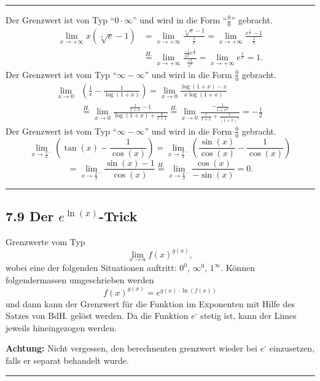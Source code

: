 \documentclass[a4paper,landscape,8pt]{extarticle}
\newcommand{\sep}{\vspace{5pt}\noindent\hrule\vspace{5pt}}
\newcommand{\Achtung}{\textbf{Achtung: }}
\begin{document}
\begin{multicols*}{4}
\begin{warmup}
\sep

\Bsp Der Grenzwert ist von Typ ``$0\cdot\infty$'' und wird in die Form
``$\frac{0}{0}$'' gebracht.
\begin{align*}
\lim_{x\to+\infty}x(\sqrt[x]{e}-1) &=
\lim_{x\to+\infty}\frac{\sqrt[x]{e}-1}{\frac{1}{x}} =
\lim_{x\to+\infty}\frac{e^\frac{1}{x}-1}{\frac{1}{x}}\\
& \stackrel{H.}{=}
\lim_{x\to+\infty}\frac{\frac{-1}{x^2}e^{\frac{1}{x}}}{\frac{-1}{x^2}}
= \lim_{x\to+\infty} e^{\frac{1}{x}} = 1.
\end{align*}
\Bsp Der Grenzwert ist vom Typ ``$\infty - \infty$'' und wird in die Form
$\frac{0}{0}$ gebracht.
\begin{align*}
\lim_{x\to 0} &\left(\frac{1}{x} - \frac{1}{\log(1+x)}\right)
=\lim_{x\to 0} \frac{\log(1+x)-x}{x\log(1+x)}\\
&\stackrel{H.}{=}
\lim_{x\to 0} \frac{\frac{1}{1+x}-1}{\log(1+x)+\frac{x}{x+1}}
\stackrel{H.}{=}
\lim_{x\to 0} \frac{-\frac{1}{1+x^2}}{\frac{1}{1+x}+
\frac{1}{(1+x)^2}}=-\frac{1}{2}
\end{align*}
\Bsp Der Grenzwert ist vom Typ ``$\infty - \infty$'' und wird in die Form
$\frac{0}{0}$ gebracht.
\[
\lim_{x\to\frac{\pi}{2}^-} \left(\tan(x)-\frac{1}{\cos(x)}\right)
=\lim_{x\to\frac{\pi}{2}^-}
\left(\frac{\sin(x)}{\cos(x)}-\frac{1}{\cos(x)}\right)
\]
\[
=\lim_{x\to\frac{\pi}{2}^-} \frac{\sin(x)-1}{\cos(x)} \stackrel{H.}{=}
\lim_{x\to\frac{\pi}{2}^-} \frac{\cos(x)}{-\sin(x)}=0.
\]
\end{warmup}

\sep

\subsection{7.9 Der $e^{\ln(x)}$-Trick}

Grenzwerte vom Typ
\[
\lim_{x\to a} f(x)^{g(x)},
\]
wobei eine der folgenden Situationen auftritt: $0^0$, $\infty^0$, $1^\infty$.
Können folgendermassen umgeschrieben werden
\[
f(x)^{g(x)} = e^{g(x)\cdot \ln(f(x))}
\]
und dann kann der Grenzwert für die Funktion im Exponenten mit Hilfe des Satzes
von BdH. gelöst werden. Da die Funktion $e^{\square}$ stetig ist, kann der Limes
jeweils hineingezogen werden.

\Achtung Nicht vergessen, den berechnenten grenzwert wieder bei $e^{\square}$
einzusetzen, falls er separat behandelt wurde.

\begin{warmup}
\sep


\end{warmup}
\end{multicols*}
\end{document}
